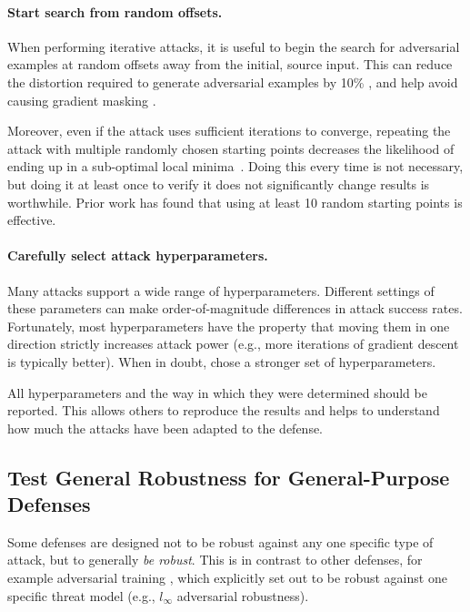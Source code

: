 \documentclass{article} %
\begin{document}
\paragraph{Start search from random offsets.}
%
When performing iterative attacks,
it is useful to begin the search for adversarial examples at random
offsets away from the initial, source input.
%
This can reduce the
distortion required to generate adversarial examples by 10\%
\citep{carlini2017towards}, and help avoid causing gradient masking
\citep{tramer2017ensemble,madry2017towards}.

Moreover, even if the attack uses sufficient iterations to converge, repeating the attack with multiple randomly chosen starting points decreases the likelihood of ending up in a sub-optimal local minima~\citep{madry2017towards,mosbach2018logit}.
%
Doing this
every time is not necessary, but doing it at least once to verify it
does not significantly change results is worthwhile.
%
Prior work has found that using at least 10 random starting points is effective.

\paragraph{Carefully select attack hyperparameters.}
%
Many attacks support a wide range of hyperparameters.
%
Different settings of these parameters
can make order-of-magnitude differences in attack success rates.
%
Fortunately, most hyperparameters have the property that moving them in
one direction strictly increases attack power (e.g., more iterations of
gradient descent is typically better).
%
When in doubt, chose a stronger set of hyperparameters.

All hyperparameters and the way in which they were determined should be reported.
%
This allows others to reproduce the results and helps to
understand how much the attacks
have been adapted to the defense.

\subsection{Test General Robustness for General-Purpose Defenses}
\label{sec:generalrobustness}
Some defenses are designed not to be robust against any one specific
type of attack, but to generally \emph{be robust}.
%
This is in contrast to other defenses, for example adversarial training
\citep{goodfellow2014explaining,madry2017towards}, which explicitly set out
to be robust against one specific threat model (e.g., $l_\infty$ adversarial
robustness).
\end{document}
